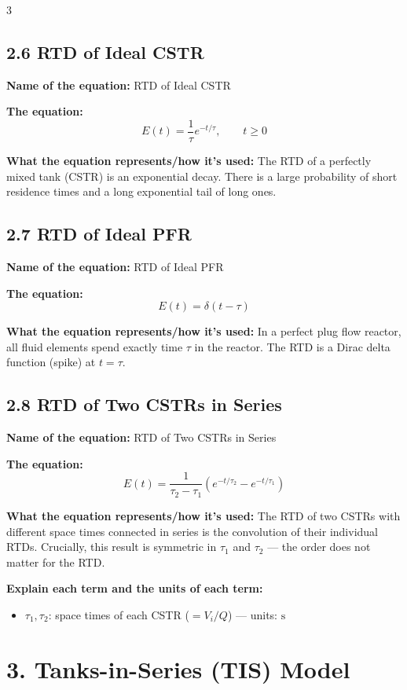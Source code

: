 \documentclass[8pt]{extarticle}
\begin{document}
\begin{multicols*}{3}
\subsection*{2.6 RTD of Ideal CSTR}

\textbf{Name of the equation:} RTD of Ideal CSTR

\textbf{The equation:}
\[
E(t)=\frac{1}{\tau}e^{-t/\tau}, \qquad t\ge 0
\]

\textbf{What the equation represents/how it's used:} The RTD of a perfectly mixed tank (CSTR) is an exponential decay. There is a large probability of short residence times and a long exponential tail of long ones.

\subsection*{2.7 RTD of Ideal PFR}

\textbf{Name of the equation:} RTD of Ideal PFR

\textbf{The equation:}
\[
E(t)=\delta(t-\tau)
\]

\textbf{What the equation represents/how it's used:} In a perfect plug flow reactor, all fluid elements spend exactly time \(\tau\) in the reactor. The RTD is a Dirac delta function (spike) at \(t=\tau\).

\subsection*{2.8 RTD of Two CSTRs in Series}

\textbf{Name of the equation:} RTD of Two CSTRs in Series

\textbf{The equation:}
\[
E(t)=\frac{1}{\tau_2-\tau_1}\left(e^{-t/\tau_2}-e^{-t/\tau_1}\right)
\]

\textbf{What the equation represents/how it's used:} The RTD of two CSTRs with different space times connected in series is the convolution of their individual RTDs. Crucially, this result is symmetric in \(\tau_1\) and \(\tau_2\) --- the order does not matter for the RTD.

\textbf{Explain each term and the units of each term:}
\begin{itemize}
\item \(\tau_1,\tau_2\): space times of each CSTR (\(=V_i/Q\)) --- units: \(\mathrm{s}\)
\end{itemize}

\section*{3. Tanks-in-Series (TIS) Model}


\end{multicols*}
\end{document}
